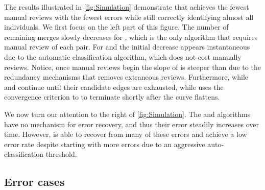     \Simulation{}

    \Refresh{}

    The results illustrated in \cref{fig:Simulation} demonstrate that  achieves the fewest manual
      reviews with the fewest errors while still correctly identifying almost all individuals.
    We first focus on the left part of this figure.
    The number of remaining merges slowly decreases for , which is the only algorithm that requires
      manual review of each pair.
    For  and  the initial decrease appears instantaneous due to the automatic
      classification algorithm, which does not cost manually reviews.
    Notice, once manual reviews begin the slope of  is steeper than  due to the
      redundancy mechanisms that removes extraneous reviews.
    Furthermore, while  and  continue until their candidate edges are exhausted,
      while  uses the convergence criterion to to terminate shortly after the curve flattens.

    We now turn our attention to the right of \cref{fig:Simulation}.
    The  and  algorithms have no mechanism for error recovery, and thus their error
      steadily increases over time.
    However,  is able to recover from many of these errors and achieve a low error rate despite
      starting with more errors due to an aggressive auto-classification threshold.
      
    \subsection{Error cases}

